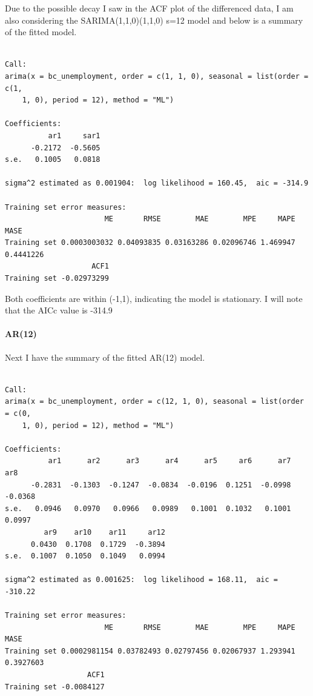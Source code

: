 \documentclass[
  letterpaper,
  DIV=11,
  numbers=noendperiod]{scrartcl}
\let\oldparagraph\paragraph
\renewcommand{\paragraph}[1]{\oldparagraph{#1}\mbox{}}
\begin{document}
Due to the possible decay I saw in the ACF plot of the differenced data,
I am also considering the SARIMA(1,1,0)(1,1,0) s=12 model and below is a
summary of the fitted model.

\begin{verbatim}

Call:
arima(x = bc_unemployment, order = c(1, 1, 0), seasonal = list(order = c(1, 
    1, 0), period = 12), method = "ML")

Coefficients:
          ar1     sar1
      -0.2172  -0.5605
s.e.   0.1005   0.0818

sigma^2 estimated as 0.001904:  log likelihood = 160.45,  aic = -314.9

Training set error measures:
                       ME       RMSE        MAE        MPE     MAPE      MASE
Training set 0.0003003032 0.04093835 0.03163286 0.02096746 1.469947 0.4441226
                    ACF1
Training set -0.02973299
\end{verbatim}

Both coefficients are within (-1,1), indicating the model is stationary.
I will note that the AICc value is -314.9

\hypertarget{ar12}{%
\paragraph{AR(12)}\label{ar12}}

Next I have the summary of the fitted AR(12) model.

\begin{verbatim}

Call:
arima(x = bc_unemployment, order = c(12, 1, 0), seasonal = list(order = c(0, 
    1, 0), period = 12), method = "ML")

Coefficients:
          ar1      ar2      ar3      ar4      ar5     ar6      ar7      ar8
      -0.2831  -0.1303  -0.1247  -0.0834  -0.0196  0.1251  -0.0998  -0.0368
s.e.   0.0946   0.0970   0.0966   0.0989   0.1001  0.1032   0.1001   0.0997
         ar9    ar10    ar11     ar12
      0.0430  0.1708  0.1729  -0.3894
s.e.  0.1007  0.1050  0.1049   0.0994

sigma^2 estimated as 0.001625:  log likelihood = 168.11,  aic = -310.22

Training set error measures:
                       ME       RMSE        MAE        MPE     MAPE      MASE
Training set 0.0002981154 0.03782493 0.02797456 0.02067937 1.293941 0.3927603
                   ACF1
Training set -0.0084127
\end{verbatim}
\end{document}
